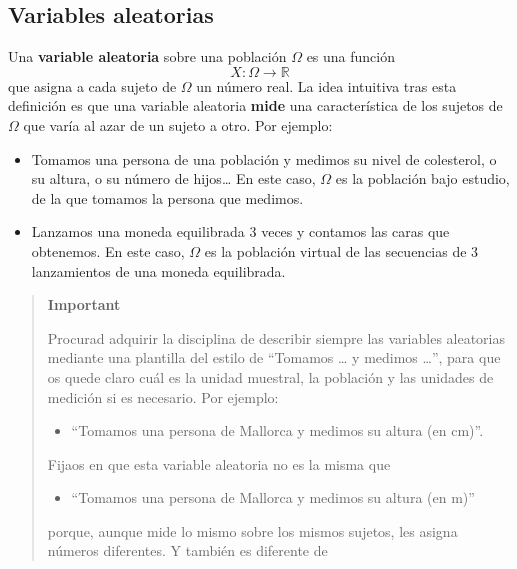 \documentclass[
  spanish,
  letterpaper,
  DIV=11,
  numbers=noendperiod]{scrreprt}
\providecommand{\tightlist}{%
  \setlength{\itemsep}{0pt}\setlength{\parskip}{0pt}}
\begin{document}
\begin{tcolorbox}

\chapter{Variables aleatorias}\label{variables-aleatorias}

Una \textbf{variable aleatoria} sobre una población \(\Omega\) es una
función \[
X: \Omega\to  \mathbb{R}
\] que asigna a cada sujeto de \(\Omega\) un número real. La idea
intuitiva tras esta definición es que una variable aleatoria
\textbf{mide} una característica de los sujetos de \(\Omega\) que varía
al azar de un sujeto a otro. Por ejemplo:

\begin{itemize}
\item
  Tomamos una persona de una población y medimos su nivel de colesterol,
  o su altura, o su número de hijos\ldots{} En este caso, \(\Omega\) es
  la población bajo estudio, de la que tomamos la persona que medimos.
\item
  Lanzamos una moneda equilibrada 3 veces y contamos las caras que
  obtenemos. En este caso, \(\Omega\) es la población virtual de las
  secuencias de 3 lanzamientos de una moneda equilibrada.
\end{itemize}

\begin{quote}
\textbf{Important}

Procurad adquirir la disciplina de describir siempre las variables
aleatorias mediante una plantilla del estilo de ``Tomamos \ldots{} y
medimos \ldots{}'', para que os quede claro cuál es la unidad muestral,
la población y las unidades de medición si es necesario. Por ejemplo:

\begin{itemize}
\tightlist
\item
  ``Tomamos una persona de Mallorca y medimos su altura (en cm)''.
\end{itemize}

Fijaos en que esta variable aleatoria no es la misma que

\begin{itemize}
\tightlist
\item
  ``Tomamos una persona de Mallorca y medimos su altura (en m)''
\end{itemize}

porque, aunque mide lo mismo sobre los mismos sujetos, les asigna
números diferentes. Y también es diferente de


\end{quote}
\end{tcolorbox}
\end{document}
